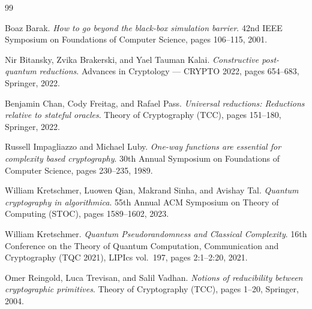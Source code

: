 \documentclass{aicr-conjecture}
\begin{document}
\begin{aicrbibliography}{99}

Boaz Barak.
\emph{How to go beyond the black-box simulation barrier}.
42nd IEEE Symposium on Foundations of Computer Science, pages 106--115,
2001.

Nir Bitansky, Zvika Brakerski, and Yael Tauman Kalai.
\emph{Constructive post-quantum reductions}.
Advances in Cryptology --- CRYPTO 2022, pages 654--683, Springer, 2022.

Benjamin Chan, Cody Freitag, and Rafael Pass.
\emph{Universal reductions: Reductions relative to stateful oracles}.
Theory of Cryptography (TCC), pages 151--180, Springer, 2022.

Russell Impagliazzo and Michael Luby.
\emph{One-way functions are essential for complexity based
cryptography}.
30th Annual Symposium on Foundations of Computer Science, pages
230--235, 1989.

William Kretschmer, Luowen Qian, Makrand Sinha, and Avishay Tal.
\emph{Quantum cryptography in algorithmica}.
55th Annual ACM Symposium on Theory of Computing (STOC), pages
1589--1602, 2023.

William Kretschmer.
\emph{Quantum Pseudorandomness and Classical Complexity}.
16th Conference on the Theory of Quantum Computation, Communication and
Cryptography (TQC 2021), LIPIcs vol.~197, pages 2:1--2:20, 2021.

Omer Reingold, Luca Trevisan, and Salil Vadhan.
\emph{Notions of reducibility between cryptographic primitives}.
Theory of Cryptography (TCC), pages 1--20, Springer, 2004.

\end{aicrbibliography}
\end{document}

